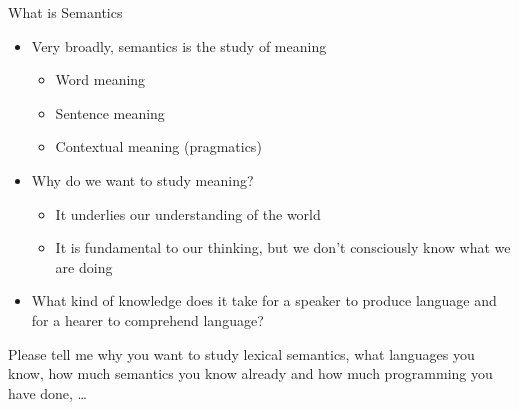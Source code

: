 \documentclass{beamer}
\begin{document}
\begin{frame}{What is Semantics}
\begin{itemize}
\item Very broadly, semantics is the study of meaning
  \begin{itemize}
  \item Word meaning
  \item Sentence meaning
  \item Contextual meaning (pragmatics)
  \end{itemize}
\item Why do we want to study meaning?
  \begin{itemize}
  \item It underlies our understanding of the world
  \item It is fundamental to our thinking, but we don't consciously know what we are doing
  \end{itemize}
\item What kind of knowledge does it take for a speaker to produce language and for a hearer to comprehend language? 
\end{itemize}
\begin{taskb}
  Please tell me why you want to study lexical semantics, what languages you know, how much semantics you know already and how much programming you have done, \ldots
\end{taskb}
\end{frame}
\end{document}
